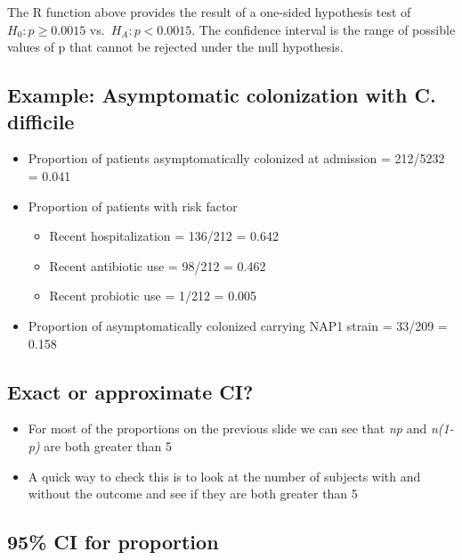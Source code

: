 \documentclass[
]{book}
\providecommand{\tightlist}{%
  \setlength{\itemsep}{0pt}\setlength{\parskip}{0pt}}
\begin{document}
The R function above provides the result of a one-sided hypothesis test of \(H_0: p≥0.0015\) vs.~\(H_A: p<0.0015\). The confidence interval is the range of possible values of p that cannot be rejected under the null hypothesis.

\hypertarget{example-asymptomatic-colonization-with-c.-difficile}{%
\subsection{Example: Asymptomatic colonization with C. difficile}\label{example-asymptomatic-colonization-with-c.-difficile}}

\begin{itemize}
\tightlist
\item
  Proportion of patients asymptomatically colonized at admission = 212/5232 = 0.041
\item
  Proportion of patients with risk factor

  \begin{itemize}
  \tightlist
  \item
    Recent hospitalization = 136/212 = 0.642
  \item
    Recent antibiotic use = 98/212 = 0.462
  \item
    Recent probiotic use = 1/212 = 0.005
  \end{itemize}
\item
  Proportion of asymptomatically colonized carrying NAP1 strain = 33/209 = 0.158
\end{itemize}

\hypertarget{exact-or-approximate-ci}{%
\subsection{Exact or approximate CI?}\label{exact-or-approximate-ci}}

\begin{itemize}
\tightlist
\item
  For most of the proportions on the previous slide we can see that \emph{np} and \emph{n(1-p)} are both greater than 5
\item
  A quick way to check this is to look at the number of subjects with and without the outcome and see if they are both greater than 5
\end{itemize}

\hypertarget{ci-for-proportion}{%
\subsection{95\% CI for proportion}\label{ci-for-proportion}}
\end{document}
